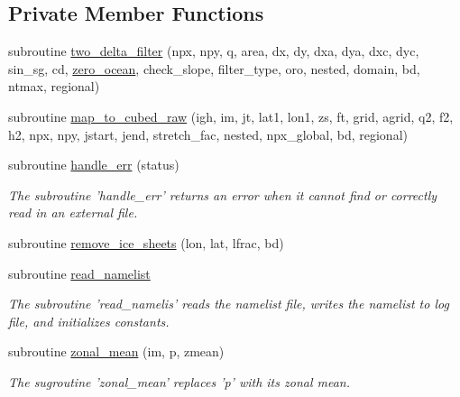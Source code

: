\subsection*{Private Member Functions}
\begin{DoxyCompactItemize}
\item 
subroutine \hyperlink{classfv__surf__map__mod_aa6e72698840d80e53f786e8f3fb55d4c}{two\-\_\-delta\-\_\-filter} (npx, npy, q, area, dx, dy, dxa, dya, dxc, dyc, sin\-\_\-sg, cd, \hyperlink{classfv__surf__map__mod_a08c3188d0168e655ed23ece6b7a57043}{zero\-\_\-ocean}, check\-\_\-slope, filter\-\_\-type, oro, nested, domain, bd, ntmax, regional)
\item 
subroutine \hyperlink{classfv__surf__map__mod_acc303dea052d12a2c64113f3893ade70}{map\-\_\-to\-\_\-cubed\-\_\-raw} (igh, im, jt, lat1, lon1, zs, ft, grid, agrid, q2, f2, h2, npx, npy, jstart, jend, stretch\-\_\-fac, nested, npx\-\_\-global, bd, regional)
\item 
subroutine \hyperlink{classfv__surf__map__mod_ab249e49f64014dc3fdc86ae5ab3de14e}{handle\-\_\-err} (status)
\begin{DoxyCompactList}\small\item\em The subroutine 'handle\-\_\-err' returns an error when it cannot find or correctly read in an external file. \end{DoxyCompactList}\item 
subroutine \hyperlink{classfv__surf__map__mod_a89b0e34cb4926fe6403376ca8fa44e53}{remove\-\_\-ice\-\_\-sheets} (lon, lat, lfrac, bd)
\item 
subroutine \hyperlink{classfv__surf__map__mod_ad3d4957033aa67f913b716448e95993f}{read\-\_\-namelist}
\begin{DoxyCompactList}\small\item\em The subroutine 'read\-\_\-namelis' reads the namelist file, writes the namelist to log file, and initializes constants. \end{DoxyCompactList}\item 
subroutine \hyperlink{classfv__surf__map__mod_aa10adedb30604d0ab2744b1126584eb6}{zonal\-\_\-mean} (im, p, zmean)
\begin{DoxyCompactList}\small\item\em The sugroutine 'zonal\-\_\-mean' replaces 'p' with its zonal mean. \end{DoxyCompactList}\end{DoxyCompactItemize}
